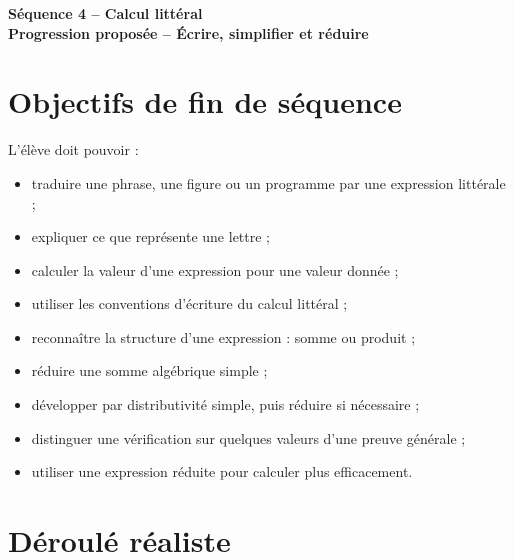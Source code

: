 \documentclass[12pt,a4paper]{article}
\newcommand{\titreseq}[1]{%
\begin{center}
{\sffamily\LARGE\bfseries\color{TitreC}Séquence 4 -- Calcul littéral}\\[0.2em]
{\sffamily\large\bfseries\color{SavoirC}#1}
\end{center}}
\begin{document}
\titreseq{Progression proposée -- Écrire, simplifier et réduire}


\section*{Objectifs de fin de séquence}

L'élève doit pouvoir :
\begin{itemize}
  \item traduire une phrase, une figure ou un programme par une expression littérale ;
  \item expliquer ce que représente une lettre ;
  \item calculer la valeur d'une expression pour une valeur donnée ;
  \item utiliser les conventions d'écriture du calcul littéral ;
  \item reconnaître la structure d'une expression : somme ou produit ;
  \item réduire une somme algébrique simple ;
  \item développer par distributivité simple, puis réduire si nécessaire ;
  \item distinguer une vérification sur quelques valeurs d'une preuve générale ;
  \item utiliser une expression réduite pour calculer plus efficacement.
\end{itemize}

\section*{Déroulé réaliste}
\end{document}
